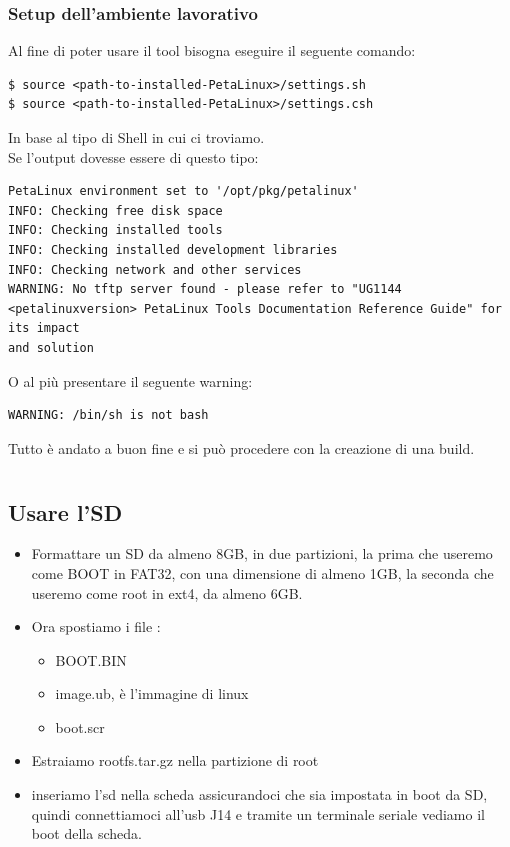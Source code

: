 \subsection{Setup dell'ambiente lavorativo}
\label{SetupPeta}
Al fine di poter usare il tool bisogna eseguire il seguente comando:
\begin{lstlisting}
$ source <path-to-installed-PetaLinux>/settings.sh
$ source <path-to-installed-PetaLinux>/settings.csh
\end{lstlisting}
In base al tipo di Shell in cui ci troviamo.\\
Se l'output dovesse essere di questo tipo:
\begin{lstlisting}
PetaLinux environment set to '/opt/pkg/petalinux'
INFO: Checking free disk space
INFO: Checking installed tools
INFO: Checking installed development libraries
INFO: Checking network and other services
WARNING: No tftp server found - please refer to "UG1144 <petalinuxversion> PetaLinux Tools Documentation Reference Guide" for its impact
and solution
\end{lstlisting}
O al più presentare il seguente warning:
\begin{lstlisting}
WARNING: /bin/sh is not bash
\end{lstlisting}
Tutto è andato a buon fine e si può procedere con la creazione di una build.


\chapter{}
\section{Usare l'SD}
\label{sd}
\begin{itemize}
\item Formattare un SD da almeno 8GB, in due partizioni, la prima che useremo come BOOT in FAT32, con una dimensione di almeno 1GB, la seconda che useremo come root in ext4, da almeno 6GB.
\item Ora spostiamo i file :
\begin{itemize}
\item BOOT.BIN
\item image.ub, è l'immagine di linux
\item boot.scr
\end{itemize}
\item Estraiamo rootfs.tar.gz nella partizione di root
\item inseriamo l'sd nella scheda assicurandoci che sia impostata in boot da SD, quindi connettiamoci all'usb J14 e tramite un terminale seriale vediamo il boot della scheda.
\end{itemize}


